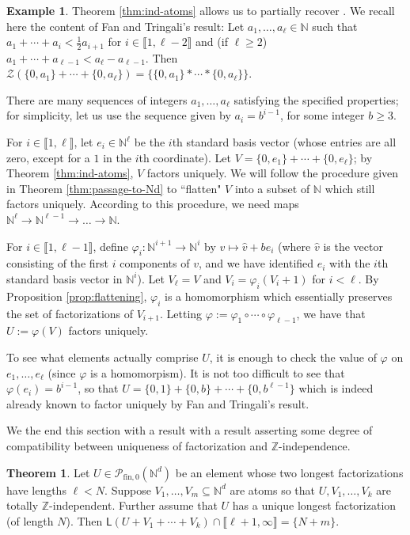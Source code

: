 \documentclass{report}
\newcommand{\NN}{\mathbb{N}}
\renewcommand{\P}{\mathcal{P}}
\newcommand{\ZZ}{\mathbb{Z}}
\newcommand{\Z}{\mathcal{Z}}
\newcommand{\llb}{\llbracket}
\newcommand{\rrb}{\rrbracket}
\newcommand{\fon}{{\textrm{fin}, 0}}
\renewcommand{\:}{\text{:}}
\theoremstyle{definition}
\newtheorem{thm}[defn]{Theorem}
\newtheorem{eg}[defn]{Example}
\begin{document}
\begin{eg} \label{eg:recover-flat-unique-fac}
Theorem \ref{thm:ind-atoms} allows us to partially recover \cite[Proposition 4.9]{fan-tringali18}.
We recall here the content of Fan and Tringali's result: Let $a_1,\dots, a_\ell \in \NN$ such that $a_1 + \cdots + a_i < \frac{1}{2} a_{i+1}$ for $i\in \llb 1,\ell-2 \rrb$ and (if $\ell \ge 2$) $a_1+\cdots + a_{\ell-1} < a_\ell - a_{\ell-1}$.
Then $\Z(\{0,a_1\}+\cdots+\{0,a_\ell\}) = \{ \{0,a_1\}*\cdots*\{0,a_\ell\}\}$.

There are many sequences of integers $a_1,\dots,a_\ell$ satisfying the specified properties; for simplicity, let us use the sequence given by $a_i = b^{i-1}$, for some integer $b \ge 3$.

For $i\in \llb 1,\ell \rrb$, let $e_i \in \NN^\ell$ be the $i$th standard basis vector (whose entries are all zero, except for a $1$ in the $i$th coordinate).
Let $V = \{0,e_1\} + \cdots + \{0,e_\ell\}$; by Theorem \ref{thm:ind-atoms}, $V$ factors uniquely.
We will follow the procedure given in Theorem \ref{thm:passage-to-Nd} to ``flatten" $V$ into a subset of $\NN$ which still factors uniquely.
According to this procedure, we need maps $\NN^\ell \to \NN^{\ell-1} \to \dots \to \NN$.

For $i\in \llb 1,\ell-1 \rrb$, define $\varphi_i: \NN^{i+1} \to \NN^{i}$ by $v \mapsto \hat{v} + be_{i}$ (where $\hat{v}$ is the vector consisting of the first $i$ components of $v$, and we have identified $e_i$ with the $i$th standard basis vector in $\NN^i$).
Let $V_\ell = V$ and $V_i = \varphi_i(V_i+1)$ for $i <\ell$.
By Proposition \ref{prop:flattening}, $\varphi_i$ is a homomorphism which essentially preserves the set of factorizations of $V_{i+1}$.
Letting $\varphi := \varphi_1\circ \cdots \circ \varphi_{\ell-1}$, we have that $U := \varphi(V)$ factors uniquely.

To see what elements actually comprise $U$, it is enough to check the value of $\varphi$ on $e_1,\dots, e_\ell$ (since $\varphi$ is a homomorpism).
It is not too difficult to see that $\varphi(e_i) = b^{i-1}$, so that $U = \{0,1\}+\{0,b\}+\cdots+\{0,b^{\ell-1}\}$ which is indeed already known to factor uniquely by Fan and Tringali's result.
\end{eg}

We the end this section with a result with a result asserting some degree of compatibility between uniqueness of factorization and $\ZZ$-independence.

\begin{thm} \label{thm:unique longest factorization}
Let $U\in \P_\fon(\NN^d)$ be an element whose two longest factorizations have lengths $\ell < N$.
Suppose $V_1,\dots,V_m\subseteq \NN^d$ are atoms so that $U,V_1,\dots, V_k$ are totally $\ZZ$-independent.
Further assume that $U$ has a unique longest factorization (of length $N$).
Then $\mathsf{L}(U+V_1+\cdots+V_k) \cap \llb \ell+1,\infty \rrb = \{N+m\}$.
\end{thm}
\end{document}

